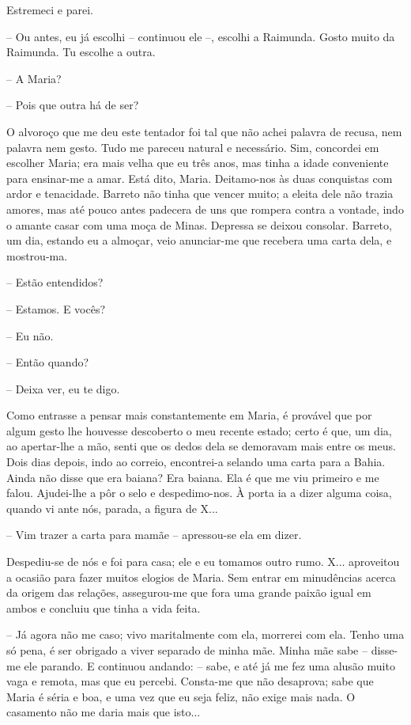 Estremeci e parei.

-- Ou antes, eu já escolhi -- continuou ele --, escolhi a Raimunda.
Gosto muito da Raimunda. Tu escolhe a outra.

-- A Maria?

-- Pois que outra há de ser?

O alvoroço que me deu este tentador foi tal que não achei palavra de
recusa, nem palavra nem gesto. Tudo me pareceu natural e necessário.
Sim, concordei em escolher Maria; era mais velha que eu três anos, mas
tinha a idade conveniente para ensinar-me a amar. Está dito, Maria.
Deitamo-nos às duas conquistas com ardor e tenacidade. Barreto não tinha
que vencer muito; a eleita dele não trazia amores, mas até pouco antes
padecera de uns que rompera contra a vontade, indo o amante casar com
uma moça de Minas. Depressa se deixou consolar. Barreto, um dia, estando
eu a almoçar, veio anunciar-me que recebera uma carta dela, e
mostrou-ma.

-- Estão entendidos?

-- Estamos. E vocês?

-- Eu não.

-- Então quando?

-- Deixa ver, eu te digo.

Como entrasse a pensar mais constantemente em Maria, é provável que por
algum gesto lhe houvesse descoberto o meu recente estado; certo é que,
um dia, ao apertar-lhe a mão, senti que os dedos dela se demoravam mais
entre os meus. Dois dias depois, indo ao correio, encontrei-a selando
uma carta para a Bahia. Ainda não disse que era baiana? Era baiana. Ela
é que me viu primeiro e me falou. Ajudei-lhe a pôr o selo e
despedimo-nos. À porta ia a dizer alguma coisa, quando vi ante nós,
parada, a figura de X...

-- Vim trazer a carta para mamãe -- apressou-se ela em dizer.

Despediu-se de nós e foi para casa; ele e eu tomamos outro rumo. X...
aproveitou a ocasião para fazer muitos elogios de Maria. Sem entrar em
minudências acerca da origem das relações, assegurou-me que fora uma
grande paixão igual em ambos e concluiu que tinha a vida feita.

-- Já agora não me caso; vivo maritalmente com ela, morrerei com ela.
Tenho uma só pena, é ser obrigado a viver separado de minha mãe. Minha
mãe sabe -- disse-me ele parando. E continuou andando: -- sabe, e até já
me fez uma alusão muito vaga e remota, mas que eu percebi. Consta-me que
não desaprova; sabe que Maria é séria e boa, e uma vez que eu seja
feliz, não exige mais nada. O casamento não me daria mais que isto...

